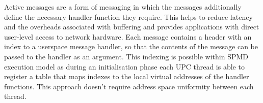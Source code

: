 Active messages are a form of messaging in which the messages additionally define the necessary handler function they require. This helps to reduce latency and the overheads associated with buffering and provides applications with direct user-level access to network hardware. Each message contains a header with an index to a userspace message handler, so that the contents of the message can be passed to the handler as an argument. This indexing is possible within SPMD execution model as during an initialisation phase each UPC thread is able to register a table that maps indexes to the local virtual addresses of the handler functions. This approach doesn't require address space uniformity between each thread.  